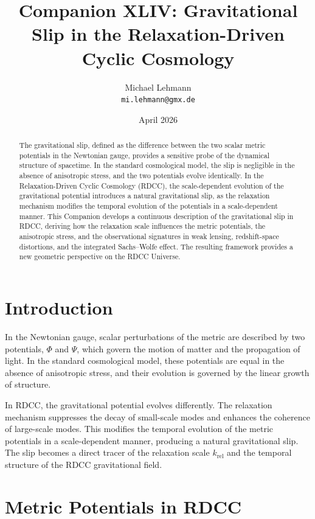\documentclass[11pt,a4paper]{article}
\title{\textbf{Companion XLIV: Gravitational Slip in the Relaxation-Driven Cyclic Cosmology}}
\author{Michael Lehmann \\ \texttt{mi.lehmann@gmx.de}}
\date{April 2026}
\begin{document}
\maketitle

\begin{abstract}
The gravitational slip, defined as the difference between the two scalar metric 
potentials in the Newtonian gauge, provides a sensitive probe of the dynamical 
structure of spacetime. In the standard cosmological model, the slip is negligible 
in the absence of anisotropic stress, and the two potentials evolve identically. 
In the Relaxation-Driven Cyclic Cosmology (RDCC), the scale-dependent evolution of 
the gravitational potential introduces a natural gravitational slip, as the 
relaxation mechanism modifies the temporal evolution of the potentials in a 
scale-dependent manner. This Companion develops a continuous description of the 
gravitational slip in RDCC, deriving how the relaxation scale influences the 
metric potentials, the anisotropic stress, and the observational signatures in 
weak lensing, redshift-space distortions, and the integrated Sachs--Wolfe effect. 
The resulting framework provides a new geometric perspective on the RDCC Universe.
\end{abstract}
\section{Introduction}

In the Newtonian gauge, scalar perturbations of the metric are described by two 
potentials, $\Phi$ and $\Psi$, which govern the motion of matter and the 
propagation of light. In the standard cosmological model, these potentials are 
equal in the absence of anisotropic stress, and their evolution is governed by the 
linear growth of structure.

In RDCC, the gravitational potential evolves differently. The relaxation mechanism 
suppresses the decay of small-scale modes and enhances the coherence of large-scale 
modes. This modifies the temporal evolution of the metric potentials in a 
scale-dependent manner, producing a natural gravitational slip. The slip becomes a 
direct tracer of the relaxation scale $k_{\mathrm{rel}}$ and the temporal structure 
of the RDCC gravitational field.
\section{Metric Potentials in RDCC}
\end{document}
